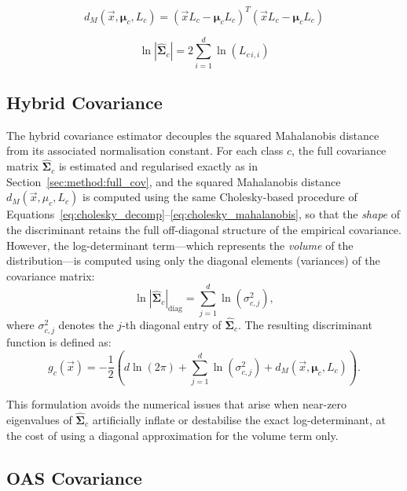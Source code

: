 \begin{equation}
	d_M(\vec{x}, \boldsymbol{\mu}_c, L_c) = (\vec{x} L_c - \boldsymbol{\mu}_c L_c)^T (\vec{x} L_c - \boldsymbol{\mu}_c L_c)
	\label{eq:cholesky_mahalanobis}
\end{equation}

\begin{equation}
	\ln |\hat{\boldsymbol{\Sigma}}_c| = 2 \sum_{i=1}^{d}{\ln(L_{c \, i,i})}
	\label{eq:cholesky_logdet}
\end{equation}

\subsection{Hybrid Covariance}
\label{sec:method:hybrid_cov}

The hybrid covariance estimator decouples the squared Mahalanobis distance from its associated normalisation constant. For each class $c$, the full covariance matrix $\hat{\boldsymbol{\Sigma}}_c$ is estimated and regularised exactly as in Section~\ref{sec:method:full_cov}, and the squared Mahalanobis distance $d_M(\vec{x}, \mu_c, L_c)$ is computed using the same Cholesky-based procedure of Equations~\eqref{eq:cholesky_decomp}--\eqref{eq:cholesky_mahalanobis}, so that the \emph{shape} of the discriminant retains the full off-diagonal structure of the empirical covariance. However, the log-determinant term---which represents the \emph{volume} of the distribution---is computed using only the diagonal elements (variances) of the covariance matrix:
\begin{equation}
	\ln |\hat{\boldsymbol{\Sigma}}_c|_{\text{diag}} = \sum_{j=1}^{d} \ln(\sigma_{c,j}^2),
	\label{eq:hybrid_logdet}
\end{equation}
where $\sigma_{c,j}^2$ denotes the $j$-th diagonal entry of $\hat{\boldsymbol{\Sigma}}_c$. The resulting discriminant function is defined as:
\begin{equation}
	g_c(\vec{x}) = -\frac{1}{2} \left( d \ln(2\pi) + \sum_{j=1}^{d} \ln(\sigma_{c,j}^2) + d_M(\vec{x}, \boldsymbol{\mu}_c, L_c) \right).
	\label{eq:hybrid_discriminant}
\end{equation}

This formulation avoids the numerical issues that arise when near-zero eigenvalues of $\hat{\boldsymbol{\Sigma}}_c$ artificially inflate or destabilise the exact log-determinant, at the cost of using a diagonal approximation for the volume term only.

\subsection{OAS Covariance}
\label{sec:method:oas}


